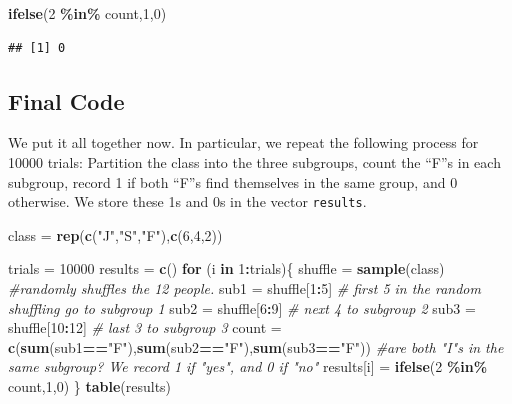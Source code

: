 \documentclass[
]{book}
\newenvironment{Shaded}{\begin{snugshade}}{\end{snugshade}}
\newcommand{\CommentTok}[1]{\textcolor[rgb]{0.56,0.35,0.01}{\textit{#1}}}
\newcommand{\ControlFlowTok}[1]{\textcolor[rgb]{0.13,0.29,0.53}{\textbf{#1}}}
\newcommand{\DecValTok}[1]{\textcolor[rgb]{0.00,0.00,0.81}{#1}}
\newcommand{\FunctionTok}[1]{\textcolor[rgb]{0.13,0.29,0.53}{\textbf{#1}}}
\newcommand{\NormalTok}[1]{#1}
\newcommand{\OtherTok}[1]{\textcolor[rgb]{0.56,0.35,0.01}{#1}}
\newcommand{\SpecialCharTok}[1]{\textcolor[rgb]{0.81,0.36,0.00}{\textbf{#1}}}
\newcommand{\StringTok}[1]{\textcolor[rgb]{0.31,0.60,0.02}{#1}}
\theoremstyle{definition}
\theoremstyle{definition}
\theoremstyle{definition}
\theoremstyle{definition}
\theoremstyle{remark}
\begin{document}
\begin{Shaded}
\begin{Highlighting}[]
\FunctionTok{ifelse}\NormalTok{(}\DecValTok{2} \SpecialCharTok{\%in\%}\NormalTok{ count,}\DecValTok{1}\NormalTok{,}\DecValTok{0}\NormalTok{)}
\end{Highlighting}
\end{Shaded}

\begin{verbatim}
## [1] 0
\end{verbatim}

\subsection{Final Code}\label{final-code-1}

We put it all together now. In particular, we repeat the following process for 10000 trials: Partition the class into the three subgroups, count the ``F''s in each subgroup, record 1 if both ``F''s find themselves in the same group, and 0 otherwise. We store these 1s and 0s in the vector \texttt{results}.

\begin{Shaded}
\begin{Highlighting}[]
\NormalTok{class }\OtherTok{=} \FunctionTok{rep}\NormalTok{(}\FunctionTok{c}\NormalTok{(}\StringTok{"J"}\NormalTok{,}\StringTok{"S"}\NormalTok{,}\StringTok{"F"}\NormalTok{),}\FunctionTok{c}\NormalTok{(}\DecValTok{6}\NormalTok{,}\DecValTok{4}\NormalTok{,}\DecValTok{2}\NormalTok{))}

\NormalTok{trials }\OtherTok{=} \DecValTok{10000}
\NormalTok{results }\OtherTok{=} \FunctionTok{c}\NormalTok{()}
\ControlFlowTok{for}\NormalTok{ (i }\ControlFlowTok{in} \DecValTok{1}\SpecialCharTok{:}\NormalTok{trials)\{}
\NormalTok{  shuffle }\OtherTok{=} \FunctionTok{sample}\NormalTok{(class) }\CommentTok{\#randomly shuffles the 12 people.}
\NormalTok{  sub1 }\OtherTok{=}\NormalTok{ shuffle[}\DecValTok{1}\SpecialCharTok{:}\DecValTok{5}\NormalTok{]  }\CommentTok{\# first 5 in the random shuffling go to subgroup 1}
\NormalTok{  sub2 }\OtherTok{=}\NormalTok{ shuffle[}\DecValTok{6}\SpecialCharTok{:}\DecValTok{9}\NormalTok{] }\CommentTok{\# next 4 to subgroup 2}
\NormalTok{  sub3 }\OtherTok{=}\NormalTok{ shuffle[}\DecValTok{10}\SpecialCharTok{:}\DecValTok{12}\NormalTok{] }\CommentTok{\# last 3 to subgroup 3}
\NormalTok{  count }\OtherTok{=} \FunctionTok{c}\NormalTok{(}\FunctionTok{sum}\NormalTok{(sub1}\SpecialCharTok{==}\StringTok{"F"}\NormalTok{),}\FunctionTok{sum}\NormalTok{(sub2}\SpecialCharTok{==}\StringTok{"F"}\NormalTok{),}\FunctionTok{sum}\NormalTok{(sub3}\SpecialCharTok{==}\StringTok{"F"}\NormalTok{))}
  \CommentTok{\#are both "I"s in the same subgroup? We record 1 if "yes", and 0 if "no"}
\NormalTok{  results[i] }\OtherTok{=} \FunctionTok{ifelse}\NormalTok{(}\DecValTok{2} \SpecialCharTok{\%in\%}\NormalTok{ count,}\DecValTok{1}\NormalTok{,}\DecValTok{0}\NormalTok{)}
\NormalTok{\}}
\FunctionTok{table}\NormalTok{(results)}
\end{Highlighting}
\end{Shaded}
\end{document}
